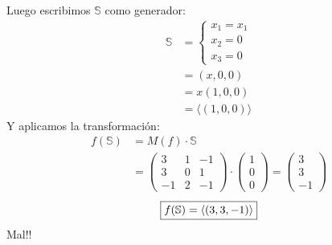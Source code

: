 \documentclass[../practica.root.tex]{subfiles}
\begin{document}
\begin{enumerate}
          Luego escribimos $\mathbb{S}$ como generador:
          \begin{align*}
              \mathbb{S} & =\begin{cases}
                  x_1=x_1 \\
                  x_2=0   \\
                  x_3=0
              \end{cases} \\
                         & =(x, 0, 0)                  \\
                         & =x(1, 0, 0)                 \\
                         & =\langle(1, 0, 0)\rangle
          \end{align*}
          Y aplicamos la transformación:
          \begin{align*}
              f(\mathbb{S}) & =M(f)\cdot\mathbb{S}                                                                    \\
                            & =\begin{pmatrix}
                  3  & 1 & -1 \\
                  3  & 0 & 1  \\
                  -1 & 2 & -1
              \end{pmatrix}\cdot\begin{pmatrix}
                  1 \\
                  0 \\
                  0
              \end{pmatrix} = \begin{pmatrix}
                  3 \\
                  3 \\
                  -1
              \end{pmatrix}
          \end{align*}
          \[ \boxed{f(\S) = \langle(3,3,-1)\rangle} \]
          Mal!!


\end{enumerate}
\end{document}
